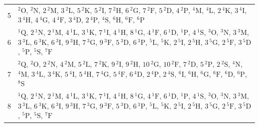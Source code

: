 \documentclass[10pt,a4paper]{article}
\numberwithin{equation}{section}
\newcommand{\spec}[1]{\mathrm{#1}}
\newcommand{\term}[2]{{}^{#1}#2}
\newlength{\fillwidth}\newlength{\cellwidth}\newlength{\colwidth}
\begin{document}
{\begin{longtable}{@{}r>{\RaggedRight\arraybackslash}p{\fillwidth}@{}}
5 & $\term{2}{\spec{O}}$, $\term{2}{\spec{N}}$, $2\,\term{2}{\spec{M}}$, $3\,\term{2}{\spec{L}}$, $5\,\term{2}{\spec{K}}$, $5\,\term{2}{\spec{I}}$, $7\,\term{2}{\spec{H}}$, $6\,\term{2}{\spec{G}}$, $7\,\term{2}{\spec{F}}$, $5\,\term{2}{\spec{D}}$, $4\,\term{2}{\spec{P}}$, $\term{4}{\spec{M}}$, $\term{4}{\spec{L}}$, $2\,\term{4}{\spec{K}}$, $3\,\term{4}{\spec{I}}$, $3\,\term{4}{\spec{H}}$, $4\,\term{4}{\spec{G}}$, $4\,\term{4}{\spec{F}}$, $3\,\term{4}{\spec{D}}$, $2\,\term{4}{\spec{P}}$, $\term{4}{\spec{S}}$, $\term{6}{\spec{H}}$, $\term{6}{\spec{F}}$, $\term{6}{\spec{P}}$\\
6 & $\term{1}{\spec{Q}}$, $2\,\term{1}{\spec{N}}$, $2\,\term{1}{\spec{M}}$, $4\,\term{1}{\spec{L}}$, $3\,\term{1}{\spec{K}}$, $7\,\term{1}{\spec{I}}$, $4\,\term{1}{\spec{H}}$, $8\,\term{1}{\spec{G}}$, $4\,\term{1}{\spec{F}}$, $6\,\term{1}{\spec{D}}$, $\term{1}{\spec{P}}$, $4\,\term{1}{\spec{S}}$, $\term{3}{\spec{O}}$, $\term{3}{\spec{N}}$, $3\,\term{3}{\spec{M}}$, $3\,\term{3}{\spec{L}}$, $6\,\term{3}{\spec{K}}$, $6\,\term{3}{\spec{I}}$, $9\,\term{3}{\spec{H}}$, $7\,\term{3}{\spec{G}}$, $9\,\term{3}{\spec{F}}$, $5\,\term{3}{\spec{D}}$, $6\,\term{3}{\spec{P}}$, $\term{5}{\spec{L}}$, $\term{5}{\spec{K}}$, $2\,\term{5}{\spec{I}}$, $2\,\term{5}{\spec{H}}$, $3\,\term{5}{\spec{G}}$, $2\,\term{5}{\spec{F}}$, $3\,\term{5}{\spec{D}}$, $\term{5}{\spec{P}}$, $\term{5}{\spec{S}}$, $\term{7}{\spec{F}}$\\
7 & $\term{2}{\spec{Q}}$, $\term{2}{\spec{O}}$, $2\,\term{2}{\spec{N}}$, $4\,\term{2}{\spec{M}}$, $5\,\term{2}{\spec{L}}$, $7\,\term{2}{\spec{K}}$, $9\,\term{2}{\spec{I}}$, $9\,\term{2}{\spec{H}}$, $10\,\term{2}{\spec{G}}$, $10\,\term{2}{\spec{F}}$, $7\,\term{2}{\spec{D}}$, $5\,\term{2}{\spec{P}}$, $2\,\term{2}{\spec{S}}$, $\term{4}{\spec{N}}$, $\term{4}{\spec{M}}$, $3\,\term{4}{\spec{L}}$, $3\,\term{4}{\spec{K}}$, $5\,\term{4}{\spec{I}}$, $5\,\term{4}{\spec{H}}$, $7\,\term{4}{\spec{G}}$, $5\,\term{4}{\spec{F}}$, $6\,\term{4}{\spec{D}}$, $2\,\term{4}{\spec{P}}$, $2\,\term{4}{\spec{S}}$, $\term{6}{\spec{I}}$, $\term{6}{\spec{H}}$, $\term{6}{\spec{G}}$, $\term{6}{\spec{F}}$, $\term{6}{\spec{D}}$, $\term{6}{\spec{P}}$, $\term{8}{\spec{S}}$\\
8 & $\term{1}{\spec{Q}}$, $2\,\term{1}{\spec{N}}$, $2\,\term{1}{\spec{M}}$, $4\,\term{1}{\spec{L}}$, $3\,\term{1}{\spec{K}}$, $7\,\term{1}{\spec{I}}$, $4\,\term{1}{\spec{H}}$, $8\,\term{1}{\spec{G}}$, $4\,\term{1}{\spec{F}}$, $6\,\term{1}{\spec{D}}$, $\term{1}{\spec{P}}$, $4\,\term{1}{\spec{S}}$, $\term{3}{\spec{O}}$, $\term{3}{\spec{N}}$, $3\,\term{3}{\spec{M}}$, $3\,\term{3}{\spec{L}}$, $6\,\term{3}{\spec{K}}$, $6\,\term{3}{\spec{I}}$, $9\,\term{3}{\spec{H}}$, $7\,\term{3}{\spec{G}}$, $9\,\term{3}{\spec{F}}$, $5\,\term{3}{\spec{D}}$, $6\,\term{3}{\spec{P}}$, $\term{5}{\spec{L}}$, $\term{5}{\spec{K}}$, $2\,\term{5}{\spec{I}}$, $2\,\term{5}{\spec{H}}$, $3\,\term{5}{\spec{G}}$, $2\,\term{5}{\spec{F}}$, $3\,\term{5}{\spec{D}}$, $\term{5}{\spec{P}}$, $\term{5}{\spec{S}}$, $\term{7}{\spec{F}}$\\

\end{longtable}}
\end{document}
